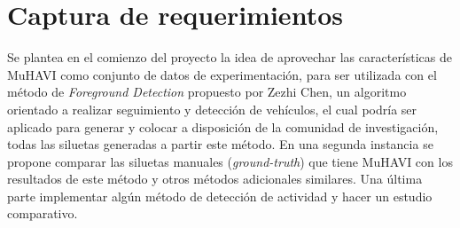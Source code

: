 %
%
%
%



\newpage
\section{Captura de requerimientos}

Se plantea en el comienzo del proyecto la idea de aprovechar las características de MuHAVI \cite{singh_muhavi_2010} como conjunto de datos de experimentación, para ser utilizada con el método de \textit{Foreground Detection} propuesto por Zezhi Chen\cite{chen_vehicle_2012}, un algoritmo orientado a  realizar seguimiento y detección de vehículos, el cual podría ser aplicado para generar  y colocar a disposición de la comunidad de investigación, todas las siluetas generadas a partir este método. En una segunda instancia se propone comparar las siluetas manuales (\textit{ground-truth}) que tiene MuHAVI con los resultados de este método y otros métodos adicionales similares. Una última parte implementar algún método de detección de actividad y hacer un estudio comparativo.

